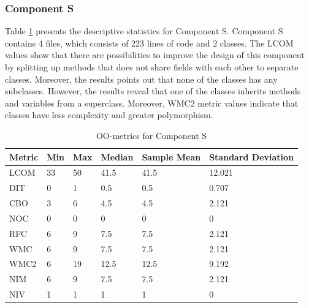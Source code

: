\subsubsection{Component S}
Table \ref{tab:oometrics-sys} presents the descriptive statistics for Component S. Component S contains 4 files, which consists of 223 lines of code and 2 classes. The LCOM values show that there are possibilities to improve the design of this component by splitting up methods that does not share fields with each other to separate classes. Moreover, the results points out that none of the classes has any subclasses. However, the results reveal that one of the classes inherits methods and variables from a superclass. Moreover, WMC2 metric values indicate that classes have less complexity and greater polymorphism.

\begin{table}[]
\centering
\caption{OO-metrics for Component S}
\label{tab:oometrics-sys}
\begin{tabular}{|l|l|l|l|l|l|}
\hline
\textbf{Metric} & \textbf{Min} & \textbf{Max} & \textbf{Median} & \textbf{Sample Mean} & \textbf{Standard Deviation} \\ \hline
LCOM            & 33           & 50           & 41.5            & 41.5                 & 12.021                      \\ \hline
DIT             & 0            & 1            & 0.5             & 0.5                  & 0.707                       \\ \hline
CBO             & 3            & 6            & 4.5             & 4.5                  & 2.121                       \\ \hline
NOC             & 0            & 0            & 0               & 0                    & 0                           \\ \hline
RFC             & 6            & 9            & 7.5             & 7.5                  & 2.121                       \\ \hline
WMC             & 6            & 9            & 7.5             & 7.5                  & 2.121                       \\ \hline
WMC2            & 6           & 19            & 12.5            & 12.5                 & 9.192                         \\ \hline
NIM             & 6            & 9            & 7.5             & 7.5                  & 2.121                       \\ \hline
NIV             & 1            & 1            & 1               & 1                    & 0                           \\ \hline
\end{tabular}
\end{table}

